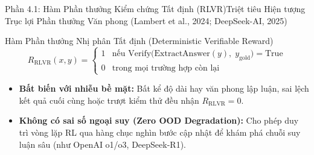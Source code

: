 \begin{frame}{Phần 4.1: Hàm Phần thưởng Kiểm chứng Tất định (RLVR)}{Triệt tiêu Hiện tượng Trục lợi Phần thưởng Văn phong (Lambert et al., 2024; DeepSeek-AI, 2025)}
  \begin{block}{Hàm Phần thưởng Nhị phân Tất định (Deterministic Verifiable Reward)}
    \[
      R_{\text{RLVR}}(x, y) = \begin{cases}
        1 & \text{nếu } \mathrm{Verify}\big(\mathrm{ExtractAnswer}(y),\; y_{\text{gold}}\big) = \mathrm{True} \\
        0 & \text{trong mọi trường hợp còn lại}
      \end{cases}
    \]
  \end{block}

  \small
  \begin{itemize}\setlength{\itemsep}{6pt}
    \item \textbf{Bất biến với nhiễu bề mặt:} Bất kể độ dài hay văn phong lập luận, sai lệch kết quả cuối cùng hoặc trượt kiểm thử đều nhận $R_{\text{RLVR}} = 0$.
    \item \textbf{Không có sai số ngoại suy (Zero OOD Degradation):} Cho phép duy trì vòng lặp RL qua hàng chục nghìn bước cập nhật để khám phá chuỗi suy luận sâu (như OpenAI o1/o3, DeepSeek-R1).
  \end{itemize}
\end{frame}

